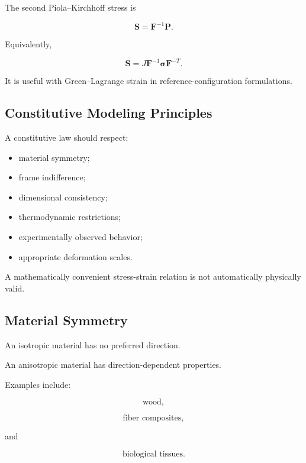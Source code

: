 The second Piola--Kirchhoff stress is

\[
\boxed{
\mathbf{S}
=
\mathbf{F}^{-1}\mathbf{P}.
}
\]

Equivalently,

\[
\boxed{
\mathbf{S}
=
J
\mathbf{F}^{-1}
\boldsymbol{\sigma}
\mathbf{F}^{-T}.
}
\]

It is useful with Green--Lagrange strain in reference-configuration
formulations.

\subsection{Constitutive Modeling Principles}
\label{subsec:constitutive-modeling-principles}

A constitutive law should respect:

\begin{itemize}
    \item material symmetry;
    \item frame indifference;
    \item dimensional consistency;
    \item thermodynamic restrictions;
    \item experimentally observed behavior;
    \item appropriate deformation scales.
\end{itemize}

A mathematically convenient stress-strain relation is not automatically
physically valid.

\subsection{Material Symmetry}
\label{subsec:material-symmetry}

An isotropic material has no preferred direction.

An anisotropic material has direction-dependent properties.

Examples include:

\[
\boxed{
\text{wood},
}
\]

\[
\boxed{
\text{fiber composites},
}
\]

and

\[
\boxed{
\text{biological tissues}.
}
\]


